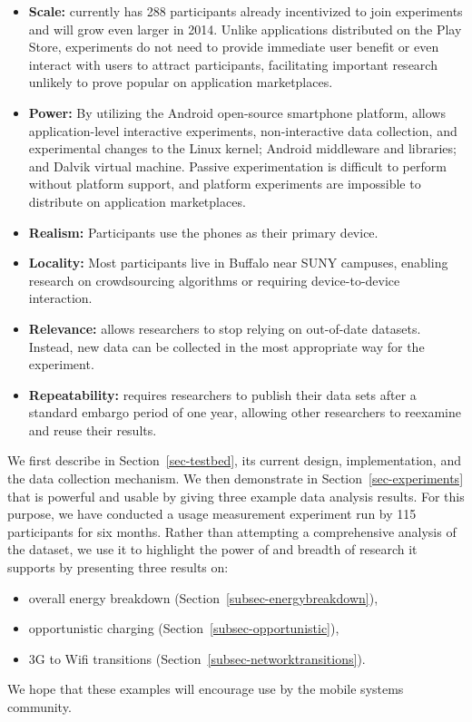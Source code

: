 \begin{itemize}

\item \textbf{Scale:} \PhoneLab{} currently has 288 participants already
incentivized to join experiments and will grow even larger in 2014. Unlike
applications distributed on the Play Store, \PhoneLab{} experiments do not
need to provide immediate user benefit or even interact with users to attract
participants, facilitating important research unlikely to prove popular on
application marketplaces.

\item \textbf{Power:} By utilizing the Android open-source smartphone
platform, \PhoneLab{} allows application-level interactive experiments,
non-interactive data collection, and experimental changes to the Linux
kernel; Android middleware and libraries; and Dalvik virtual machine. Passive
experimentation is difficult to perform without platform support, and
platform experiments are impossible to distribute on application
marketplaces.

\item \textbf{Realism:} Participants use the phones as their primary device.

\item \textbf{Locality:} Most participants live in Buffalo near SUNY campuses,
enabling research on crowdsourcing algorithms or requiring device-to-device
interaction.

\item \textbf{Relevance:} \PhoneLab{} allows researchers to stop relying on
out-of-date datasets. Instead, new data can be collected in the most
appropriate way for the experiment.

\item \textbf{Repeatability:} \PhoneLab{} requires researchers to publish
their data sets after a standard embargo period of one year, allowing other
researchers to reexamine and reuse their results.

\end{itemize}

We first describe \PhoneLab{} in Section~\ref{sec-testbed}, its current
design, implementation, and the data collection mechanism. We then
demonstrate in Section~\ref{sec-experiments} that \PhoneLab{} is powerful and
usable by giving three example data analysis results. For this purpose, we
have conducted a usage measurement experiment run by 115 \PhoneLab{}
participants for six months. Rather than attempting a comprehensive analysis
of the dataset, we use it to highlight the power of \PhoneLab{} and breadth
of research it supports by presenting three results on:

\begin{itemize}
\item overall energy breakdown (Section~\ref{subsec-energybreakdown}),
\item opportunistic charging (Section~\ref{subsec-opportunistic}),
\item 3G to Wifi transitions (Section~\ref{subsec-networktransitions}).
\vspace{0.05in}
\end{itemize}

We hope that these examples will encourage \PhoneLab{} use by the mobile systems
community.
